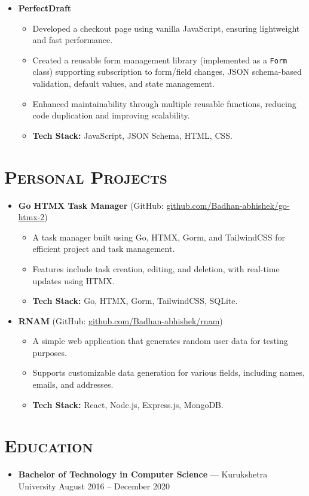 \documentclass[a4paper,10pt]{article}
\newcommand{\resumesection}[1]{\section*{\scshape{#1}}}
\newcommand{\resumeitem}[2]{\item \textbf{#1} --- #2}
\begin{document}
\begin{itemize}[leftmargin=0.5cm]
    \item \textbf{PerfectDraft}
    \begin{itemize}
       \item Developed a checkout page using vanilla JavaScript, ensuring lightweight and fast performance.
       \item Created a reusable form management library (implemented as a \texttt{Form} class) supporting subscription to form/field changes, JSON schema-based validation, default values, and state management.
       \item Enhanced maintainability through multiple reusable functions, reducing code duplication and improving scalability.
       \item \textbf{Tech Stack:} JavaScript, JSON Schema, HTML, CSS.
    \end{itemize}
\end{itemize}

\resumesection{Personal Projects}
\begin{itemize}[leftmargin=0.5cm]
   \item \textbf{Go HTMX Task Manager} (GitHub: \href{https://github.com/Badhan-abhishek/go-htmx-2}{github.com/Badhan-abhishek/go-htmx-2})
   \begin{itemize}
      \item A task manager built using Go, HTMX, Gorm, and TailwindCSS for efficient project and task management.
      \item Features include task creation, editing, and deletion, with real-time updates using HTMX.
      \item \textbf{Tech Stack:} Go, HTMX, Gorm, TailwindCSS, SQLite.
   \end{itemize}
   \item \textbf{RNAM} (GitHub: \href{https://github.com/Badhan-abhishek/rnam}{github.com/Badhan-abhishek/rnam})
   \begin{itemize}
      \item A simple web application that generates random user data for testing purposes.
      \item Supports customizable data generation for various fields, including names, emails, and addresses.
      \item \textbf{Tech Stack:} React, Node.js, Express.js, MongoDB.
   \end{itemize}
\end{itemize}

\resumesection{Education}
\begin{itemize}[leftmargin=0.5cm]
  \resumeitem{Bachelor of Technology in Computer Science}{Kurukshetra University \hfill August 2016 -- December 2020}
\end{itemize}
\end{document}
